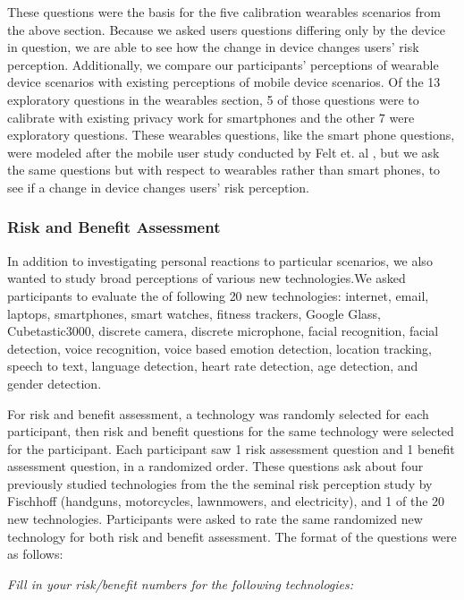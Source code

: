 \documentclass{acm_proc_article-sp}
\begin{document}
These questions were the basis for the five calibration wearables scenarios from the above section. Because we asked users questions differing only by the device in question, we are able to see how the change in device changes users' risk perception. Additionally, we compare our participants' perceptions of wearable device scenarios with existing perceptions of mobile device scenarios. Of the 13 exploratory questions in the wearables section, 5 of those questions were to calibrate with existing privacy work for smartphones and the other 7  were exploratory questions. These wearables questions, like the smart phone questions, were modeled after the mobile user study conducted by Felt et. al \cite{Felt}, but we ask the same questions but with respect to wearables rather than smart phones, to see if a change in device changes users' risk perception.


\subsubsection{Risk and Benefit Assessment}

In addition to investigating personal reactions to particular scenarios, we also wanted to study broad perceptions of various new technologies.We asked participants to evaluate the of following 20 new technologies: internet, email, laptops, smartphones, smart watches, fitness trackers, Google Glass, Cubetastic3000, discrete camera, discrete microphone, facial recognition, facial detection, voice recognition, voice based emotion detection, location tracking, speech to text, language detection, heart rate detection, age detection, and gender detection. 

For risk and benefit assessment, a technology was randomly selected for each participant, then risk and benefit questions for the same technology were selected for the participant. Each participant saw 1 risk assessment question and 1 benefit assessment question, in a randomized order. These questions ask about four previously studied technologies from the the seminal risk perception study by Fischhoff \cite{Fischhoff} (handguns, motorcycles, lawnmowers, and electricity), and 1 of the 20 new technologies.  Participants were asked to rate the same randomized new technology for both risk and benefit assessment. The format of the questions were as follows:

\textit{Fill in your risk/benefit numbers for the following technologies:}\\[-.5cm]
\end{document}
